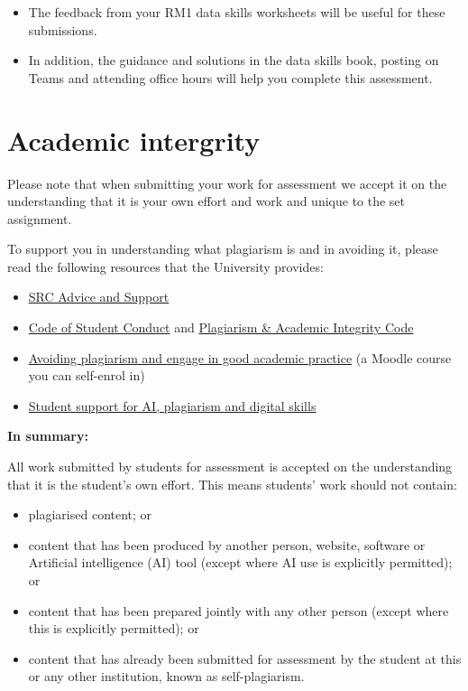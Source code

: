\documentclass[
  english,
  letterpaper,
  DIV=11,
  numbers=noendperiod]{scrreprt}
\providecommand{\tightlist}{%
  \setlength{\itemsep}{0pt}\setlength{\parskip}{0pt}}
\begin{document}
\begin{itemize}
\item
  The feedback from your RM1 data skills worksheets will be useful for
  these submissions.
\item
  In addition, the guidance and solutions in the data skills book,
  posting on Teams and attending office hours will help you complete
  this assessment.
\end{itemize}

\section{Academic intergrity}\label{academic-intergrity}

Please note that when submitting your work for assessment we accept it
on the understanding that it is your own effort and work and unique to
the set assignment.

To support you in understanding what plagiarism is and in avoiding it,
please read the following resources that the University provides:

\begin{itemize}
\tightlist
\item
  \href{https://www.glasgowunisrc.org/advice/}{SRC Advice and Support}
\item
  \href{https://www.gla.ac.uk/myglasgow/apg/policies/uniregs/regulations2025-26/feesandgeneral/studentsupportandconductmatters/reg33/}{Code
  of Student Conduct} and
  \href{https://www.gla.ac.uk/myglasgow/apg/policies/uniregs/regulations2025-26/feesandgeneral/studentsupportandconductmatters/reg32/}{Plagiarism
  \& Academic Integrity Code}
\item
  \href{https://moodle.gla.ac.uk/course/view.php?id=13038}{Avoiding
  plagiarism and engage in good academic practice} (a Moodle course you
  can self-enrol in)
\item
  \href{https://www.gla.ac.uk/myglasgow/sld/}{Student support for AI,
  plagiarism and digital skills}
\end{itemize}

\textbf{In summary:}

All work submitted by students for assessment is accepted on the
understanding that it is the student's own effort. This means students'
work should not contain:

\begin{itemize}
\tightlist
\item
  plagiarised content; or
\item
  content that has been produced by another person, website, software or
  Artificial intelligence (AI) tool (except where AI use is explicitly
  permitted); or
\item
  content that has been prepared jointly with any other person (except
  where this is explicitly permitted); or
\item
  content that has already been submitted for assessment by the student
  at this or any other institution, known as self-plagiarism.
\end{itemize}
\end{document}
